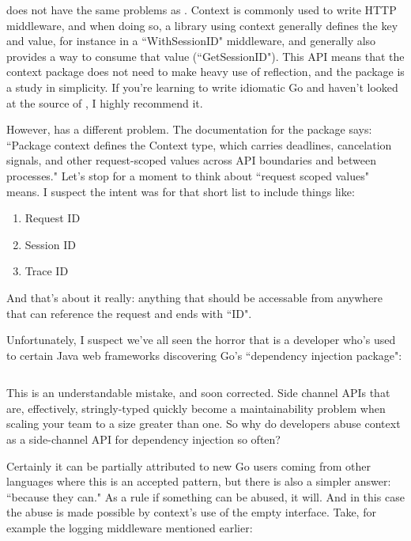 \documentclass{article}
\begin{document}
 does not have the same problems as .
Context is commonly used to write HTTP middleware, and when doing so, a library
using context generally defines the key and value, for instance in a
``WithSessionID" middleware, and generally also provides a way to consume that
value (``GetSessionID").
This API means that the context package does not need to make heavy use of
reflection, and the package is a study in simplicity.
If you're learning to write idiomatic Go and haven't looked at the source of
, I highly recommend it.

However,  has a different problem.
The documentation for the  package says:
``Package context defines the Context type, which carries deadlines, cancelation
signals, and other request-scoped values across API boundaries and between
processes."
Let's stop for a moment to think about ``request scoped values" means.
I suspect the intent was for that short list to include things like:
\begin{enumerate}
	\item Request ID
	\item Session ID
	\item Trace ID
\end{enumerate}
And that's about it really: anything that should be accessable from anywhere
that can reference the request and ends with ``ID".

Unfortunately, I suspect we've all seen the horror that
is a developer who's used to certain Java web frameworks discovering Go's
``dependency injection package":

\begin{multicols}{2}
	\inputminted{go}{example3.go}
\end{multicols}

This is an understandable mistake, and soon corrected.
Side channel APIs that are, effectively, stringly-typed quickly become a
maintainability problem when scaling your team to a size greater than one.
So why do developers abuse context as a side-channel API for dependency
injection so often?

Certainly it can be partially attributed to new Go users coming from other
languages where this is an accepted pattern, but there is also a simpler answer:
``because they can."
As a rule if something can be abused, it will.
And in this case the abuse is made possible by context's use of the empty
interface.
Take, for example the logging middleware mentioned earlier:
\end{document}

